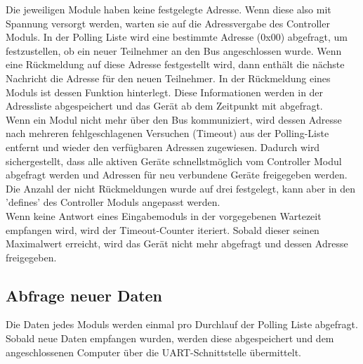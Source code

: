 


Die jeweiligen Module haben keine festgelegte Adresse. Wenn diese also mit Spannung versorgt werden, warten sie auf die Adressvergabe des Controller Moduls. In der Polling Liste wird eine bestimmte Adresse (0x00) abgefragt, um festzustellen, ob ein neuer Teilnehmer an den Bus angeschlossen wurde. Wenn eine Rückmeldung auf diese Adresse festgestellt wird, dann enthält die nächste Nachricht die Adresse für den neuen Teilnehmer. In der Rückmeldung eines Moduls ist dessen Funktion hinterlegt. Diese Informationen werden in der Adressliste abgespeichert und das Gerät ab dem Zeitpunkt mit abgefragt.\\



Wenn ein Modul nicht mehr über den Bus kommuniziert, wird dessen Adresse nach mehreren fehlgeschlagenen Versuchen (Timeout) aus der Polling-Liste entfernt und wieder den verfügbaren Adressen zugewiesen. Dadurch wird sichergestellt, dass alle aktiven Geräte schnellstmöglich vom Controller Modul abgefragt werden und Adressen für neu verbundene Geräte freigegeben werden. Die Anzahl der nicht Rückmeldungen wurde auf drei festgelegt, kann aber in den 'defines' des Controller Moduls angepasst werden.
\\



Wenn keine Antwort eines Eingabemoduls in der vorgegebenen Wartezeit empfangen wird, wird der Timeout-Counter iteriert. Sobald dieser seinen Maximalwert erreicht, wird das Gerät nicht mehr abgefragt und dessen Adresse freigegeben.


\subsection{Abfrage neuer Daten}
Die Daten jedes Moduls werden einmal pro Durchlauf der Polling Liste abgefragt. Sobald neue Daten empfangen wurden, werden diese abgespeichert und dem angeschlossenen Computer über die UART-Schnittstelle übermittelt.\\

